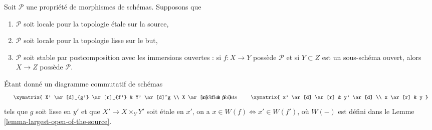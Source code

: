 \begin{lemma}
\label{lemma-etale-tau-local-source-target}
Soit $\mathcal{P}$ une propriété de morphismes de schémas. Supposons que
\begin{enumerate}
\item $\mathcal{P}$ soit locale pour la topologie \'etale sur la source,
\item $\mathcal{P}$ soit locale pour la topologie lisse sur le but,
\item $\mathcal{P}$ soit stable par postcomposition avec les immersions
ouvertes : si $f : X \to Y$ possède $\mathcal{P}$ et si $Y \subset Z$ est un
sous-schéma ouvert, alors $X \to Z$ possède $\mathcal{P}$.
\end{enumerate}
Étant donné un diagramme commutatif de schémas
$$
\vcenter{
\xymatrix{
X' \ar[d]_{g'} \ar[r]_{f'} & Y' \ar[d]^g \\
X \ar[r]^f & Y
}
}
\quad\text{avec les points}\quad
\vcenter{
\xymatrix{
x' \ar[d] \ar[r] & y' \ar[d] \\
x \ar[r] & y
}
}
$$
tels que $g$ soit lisse en $y'$ et que $X' \to X \times_Y Y'$ soit \'etale
en $x'$, on a $x \in W(f) \Leftrightarrow x' \in W(f')$, où $W(-)$ est défini
dans le Lemme \ref{lemma-largest-open-of-the-source}.
\end{lemma}

